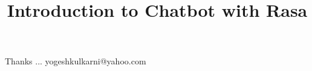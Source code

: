 \documentclass[xcolor=dvipsnames,compress,t,pdf,9pt]{beamer}
\title[\insertframenumber /\inserttotalframenumber]{Introduction to Chatbot with Rasa}
\begin{document}
	\begin{frame}
	\titlepage
%
	\end{frame}
	
%	
	
	
	\begin{frame}[c]{}
	Thanks ...
	\vspace{5mm}
	yogeshkulkarni@yahoo.com
	\end{frame}
\end{document}

